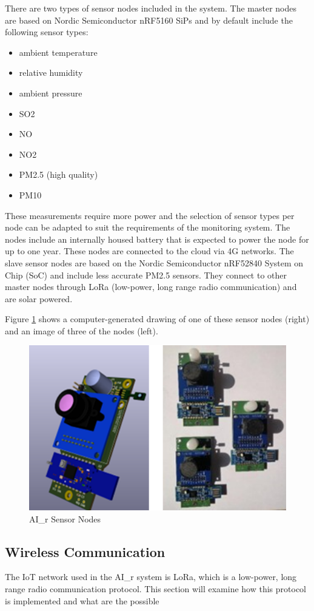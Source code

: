 \documentclass[a4paper,twoside,12pt]{report}
\begin{document}
\newline
There are two types of sensor nodes included in the system. The master nodes are based on Nordic Semiconductor nRF5160 SiPs and by default include the following sensor types:
\begin{itemize}
    \item ambient temperature
    \item relative humidity
    \item ambient pressure
    \item SO2
    \item NO
    \item NO2
    \item PM2.5 (high quality)
    \item PM10
\end{itemize}
These measurements require more power and the selection of sensor types per node can be adapted to suit the requirements of the monitoring system. The nodes include an internally housed battery that is expected to power the node for up to one year. These nodes are connected to the cloud via 4G networks.
\newline
The slave sensor nodes are based on the Nordic Semiconductor nRF52840 System on Chip (SoC) and include less accurate PM2.5 sensors. They connect to other master nodes through LoRa (low-power, long range radio communication) and are solar powered.
\newline 

Figure \ref{fig:SensorNodes} shows a computer-generated drawing of one of these sensor nodes (right) and an image of three of the nodes (left).

\begin{figure}[ht]
	\centering
	\includegraphics[width=0.5\linewidth]{images/SensorNodes.png}
	\caption{AI\_r Sensor Nodes}
	\label{fig:SensorNodes}
\end{figure}


\subsection{Wireless Communication}
The IoT network used in the AI\_r system is LoRa, which is a low-power, long range radio communication protocol. This section will examine how this protocol is implemented and what are the possible
\end{document}
